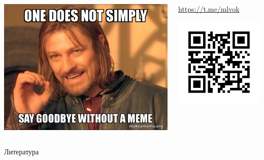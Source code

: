 \documentclass[11pt,aspectratio=169,handout]{beamer}
\begin{document}
\begin{frame}{}

\begin{columns}
\begin{column}{0.45\textwidth}
   \begin{center}
                \includegraphics[scale=0.35]{images/bye.jpeg}
   \end{center}
\end{column}
\begin{column}{0.45\textwidth}
   \begin{center}
                \url{https://t.me/mlvok}

                \includegraphics[scale=0.5]{images/tgqr.png}
   \end{center}
\end{column}
\end{columns}

\end{frame}

\begin{frame}[allowframebreaks]{Литература}




\end{frame}
\end{document}
